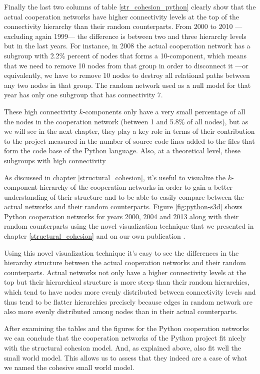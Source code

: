 Finally the last two columns of table \ref{str_cohesion_python} clearly show that the actual cooperation networks have higher connectivity levels at the top of the connectivity hierarchy than their random counterparts. From 2000 to 2010 ---excluding again 1999--- the difference is between two and three hierarchy levels but in the last years. For instance, in 2008 the actual cooperation network has a subgroup with 2.2\% percent of nodes that forms a 10-component, which means that we need to remove 10 nodes from that group in order to disconnect it ---or equivalently, we have to remove 10 nodes to destroy all relational paths between any two nodes in that group. The random network used as a null model for that year has only one subgroup that has connectivity 7.

These high connectivity $k$-components only have a very small percentage of all the nodes in the cooperation network (between 1 and 5.8\% of all nodes), but as we will see in the next chapter, they play a key role in terms of their contribution to the project measured in the number of source code lines added to the files that form the code base of the Python language. Also, at a theoretical level, these subgroups with high connectivity 

As discussed in chapter \ref{structural_cohesion}, it's useful to visualize the $k$-component hierarchy of the cooperation networks in order to gain a better understanding of their structure and to be able to easily compare between the actual networks and their random counterparts. Figure \ref{fig:python-s3d} shows Python cooperation networks for years 2000, 2004 and 2013 along with their random counterparts using the novel visualization technique that we presented in chapter \ref{structural_cohesion} and on our own publication \citep{torrents:2015}.

Using this novel visualization technique it's easy to see the differences in the hierarchy structure between the actual cooperation networks and their random counterparts. Actual networks not only have a higher connectivity levels at the top but their hierarchical structure is more steep than their random hierarchies, which tend to have nodes more evenly distributed between connectivity levels and thus tend to be flatter hierarchies precisely because edges in random network are also more evenly distributed among nodes than in their actual counterparts.

After examining the tables and the figures for the Python cooperation networks we can conclude that the cooperation networks of the Python project fit nicely with the structural cohesion model. And, as explained above, also fit well the small world model. This allows us to assess that they indeed are a case of what we named the cohesive small world model.


